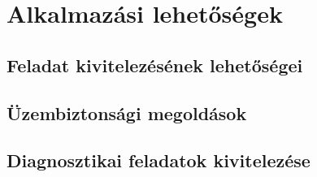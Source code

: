 \chapter{Alkalmazási lehetőségek}
\label{sec:Alkalmazas}

\section{Feladat kivitelezésének lehetőségei}

\section{Üzembiztonsági megoldások}

\section{Diagnosztikai feladatok kivitelezése}
